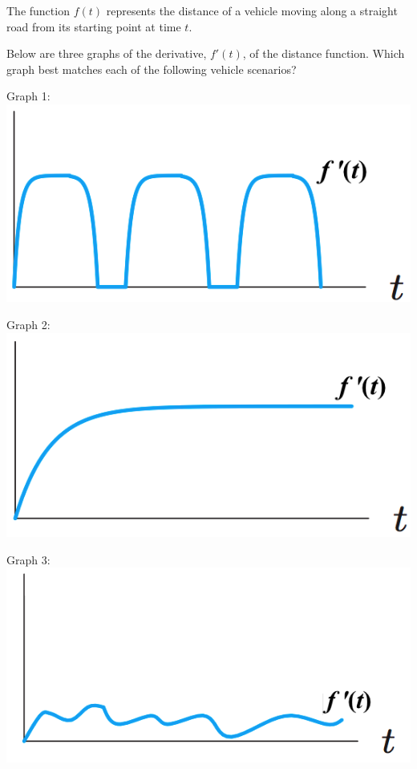 \documentclass[handout]{ximera}
\begin{document}
\begin{problem}
The function $f(t)$ represents the distance of a vehicle moving along a straight road from its starting point at time $t$. 

Below are three graphs of the derivative, $f'(t)$, of the distance function. Which graph best matches each of the following vehicle scenarios?

Graph 1: \includegraphics[scale=0.25]{Bus-A.png}

Graph 2: \includegraphics[scale=0.25]{Car-A.png}

Graph 3: \includegraphics[scale=0.25]{Car-traffic-A.png}



\end{problem}
\end{document}
